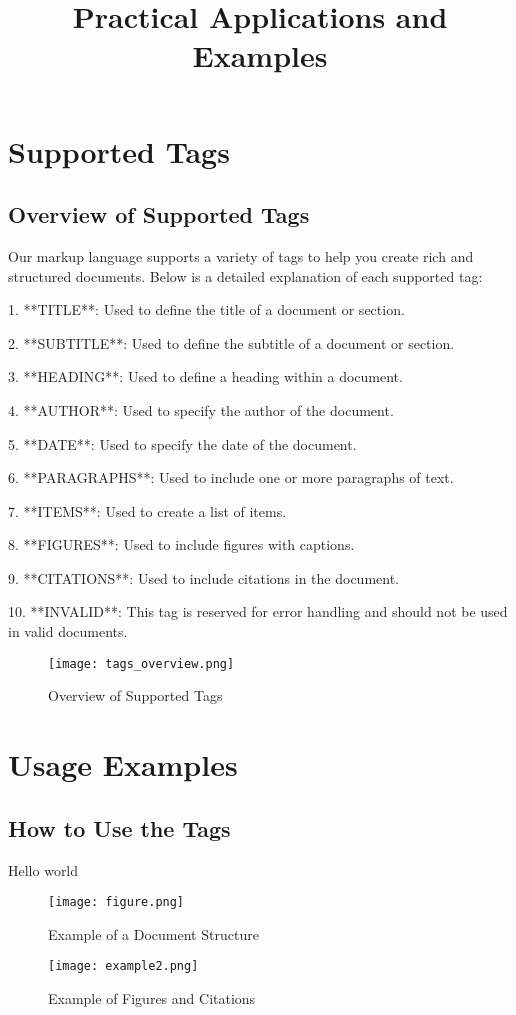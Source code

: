 \documentclass[oneside]{memoir}
\begin{document}
\newpage
\chapter{Supported Tags}
\section{Overview of Supported Tags}
Our markup language supports a variety of tags to help you create rich and structured documents. Below is a detailed explanation of each supported tag:\par
1. **TITLE**: Used to define the title of a document or section.\par
2. **SUBTITLE**: Used to define the subtitle of a document or section.\par
3. **HEADING**: Used to define a heading within a document.\par
4. **AUTHOR**: Used to specify the author of the document.\par
5. **DATE**: Used to specify the date of the document.\par
6. **PARAGRAPHS**: Used to include one or more paragraphs of text.\par
7. **ITEMS**: Used to create a list of items.\par
8. **FIGURES**: Used to include figures with captions.\par
9. **CITATIONS**: Used to include citations in the document.\par
10. **INVALID**: This tag is reserved for error handling and should not be used in valid documents.\par
\begin{figure}
\centering
\texttt{[image: tags\_overview.png]}
\caption{Overview of Supported Tags}
\end{figure}

\newpage
\chapter{Usage Examples}
\section{How to Use the Tags}
\title{Practical Applications and Examples}
Hello world\par
\begin{figure}
\centering
\texttt{[image: figure.png]}
\caption{Example of a Document Structure}
\centering
\texttt{[image: example2.png]}
\caption{Example of Figures and Citations}
\end{figure}
\end{document}
